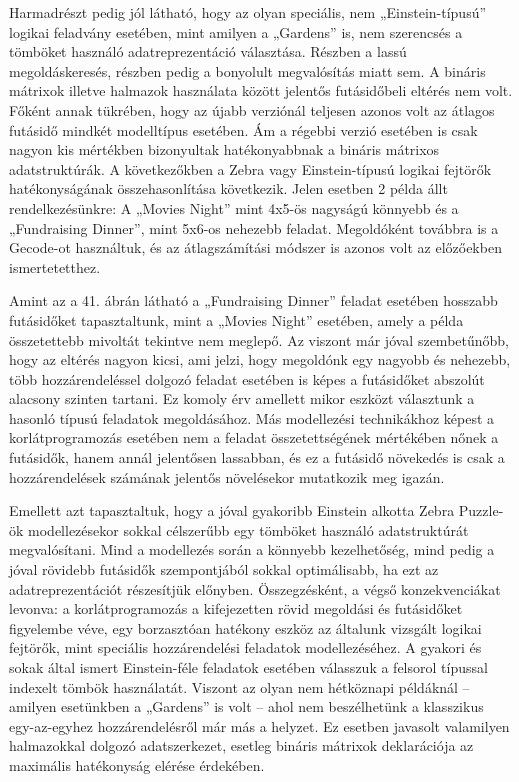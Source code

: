 \documentclass[12pt,a4paper,twoside, openright]{report}
\begin{document}
    Harmadrészt pedig jól látható, hogy az olyan speciális, nem „Einstein-típusú” logikai feladvány esetében, mint amilyen a „Gardens” is, nem szerencsés a tömböket használó adatreprezentáció választása.
    Részben a lassú megoldáskeresés, részben pedig a bonyolult megvalósítás miatt sem.
    A bináris mátrixok illetve halmazok használata között jelentős futásidőbeli eltérés nem volt.
    Főként annak tükrében, hogy az újabb verziónál teljesen azonos volt az átlagos futásidő mindkét modelltípus esetében.
    Ám a régebbi verzió esetében is csak nagyon kis mértékben bizonyultak hatékonyabbnak a bináris mátrixos adatstruktúrák.
    A következőkben a Zebra vagy Einstein-típusú logikai fejtörők hatékonyságának 
    összehasonlítása következik.
    Jelen esetben 2 példa állt rendelkezésünkre: A „Movies 
    Night” mint 4x5-ös nagyságú könnyebb és a „Fundraising Dinner”, mint 5x6-os nehezebb 
    feladat.
    Megoldóként továbbra is a Gecode-ot használtuk, és az átlagszámítási módszer 
    is azonos volt az előzőekben ismertetetthez.


    Amint az a 41. ábrán látható a „Fundraising Dinner” feladat esetében hosszabb futásidőket tapasztaltunk, mint a „Movies Night” esetében, amely a példa összetettebb mivoltát tekintve nem meglepő.
    Az viszont már jóval szembetűnőbb, hogy az eltérés nagyon kicsi, ami jelzi, hogy megoldónk egy nagyobb és nehezebb, több hozzárendeléssel dolgozó feladat esetében is képes a futásidőket abszolút alacsony szinten tartani.
    Ez komoly érv amellett mikor eszközt választunk a hasonló típusú feladatok megoldásához.
    Más modellezési technikákhoz képest a korlátprogramozás esetében nem a feladat összetettségének mértékében nőnek a futásidők, hanem annál jelentősen lassabban, és ez a futásidő növekedés is csak a hozzárendelések számának jelentős növelésekor mutatkozik meg igazán.

    Emellett azt tapasztaltuk, hogy a jóval gyakoribb Einstein alkotta Zebra Puzzle-ök modellezésekor sokkal célszerűbb egy tömböket használó adatstruktúrát megvalósítani.
    Mind a modellezés során a könnyebb kezelhetőség, mind pedig a jóval rövidebb futásidők szempontjából sokkal optimálisabb, ha ezt az adatreprezentációt részesítjük előnyben.
    Összegzésként, a végső konzekvenciákat levonva: a korlátprogramozás a kifejezetten rövid megoldási és futásidőket figyelembe véve, egy borzasztóan hatékony eszköz az általunk vizsgált logikai fejtörők, mint speciális hozzárendelési feladatok modellezéséhez.
    A gyakori és sokak által ismert Einstein-féle feladatok esetében válasszuk a felsorol típussal indexelt tömbök használatát.
    Viszont az olyan nem hétköznapi példáknál – amilyen esetünkben a „Gardens” is volt – ahol nem beszélhetünk a klasszikus egy-az-egyhez hozzárendelésről már más a helyzet.
    Ez esetben javasolt valamilyen halmazokkal dolgozó adatszerkezet, esetleg bináris mátrixok deklarációja az maximális hatékonyság elérése érdekében.
\end{document}
